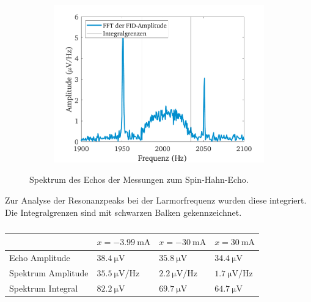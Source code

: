 \documentclass[../main.tex]{subfiles}
\begin{document}
\begin{figure}[H]
            \begin{subfigure}[c]{0.5\textwidth}
                \includegraphics[width=\linewidth]{Bilddateien/9/worse_positive/Fig_2}
                \label{fig:Hahn_Spektrum_pos}
            \end{subfigure}
            \caption{Spektrum des Echos der Messungen zum Spin-Hahn-Echo.}
            \label{fig:Hahn_Spektrum}
    \end{figure}
    Zur Analyse der Resonanzpeaks bei der Larmorfrequenz wurden diese integriert. Die Integralgrenzen sind mit schwarzen Balken gekennzeichnet.
    \begin{table}[H]
        \centering
        \begin{tabular}{l|lll}
                           & $x=\SI{-3,99}{\milli \ampere}$          & $x=\SI{-30}{\milli \ampere}$           & $x=\SI{30}{\milli \ampere}$            \\ \hline
        Echo Amplitude     & $\SI{38,4}{\micro \volt}$             & $\SI{35,8}{\micro \volt}$            & $\SI{34,4}{\micro \volt}$            \\ \hline
        Spektrum Amplitude& $\SI{35,5}{\micro \volt \per \hertz}$ & $\SI{2,2}{\micro \volt \per \hertz}$ & $\SI{1,7}{\micro \volt \per \hertz}$ \\ \cline{1-1}
        Spektrum Integral  & $\SI{82,2}{\micro \volt}$             & $\SI{69,7}{\micro \volt}$            & $\SI{64,7}{\micro \volt}$           
        \end{tabular}
        \caption{}
        \label{tab:Hahn_Echo}
    \end{table}
\end{document}
